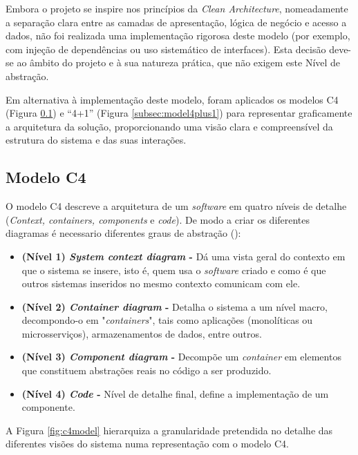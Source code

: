 Embora o projeto se inspire nos princípios da \textit{Clean Architecture}, nomeadamente a separação clara entre as camadas de apresentação, lógica de negócio e acesso a dados, não foi realizada uma implementação rigorosa deste modelo (por exemplo, com injeção de dependências ou uso sistemático de interfaces). Esta decisão deve-se ao âmbito do projeto e à sua natureza prática, que não exigem este Nível de abstração.

Em alternativa à implementação deste modelo, foram aplicados os modelos C4 (Figura \ref{subsec:modelC4}) e “4+1” (Figura \ref{subsec:model4plus1}) para representar graficamente a arquitetura da solução, proporcionando uma visão clara e compreensível da estrutura do sistema e das suas interações.


\subsection{Modelo C4}
\label{subsec:modelC4}

O modelo C4 descreve a arquitetura de um \textit{software} em quatro níveis de detalhe (\textit{Context, containers, components} e \textit{code}). De modo a criar os diferentes diagramas é necessario diferentes graus de abstração (\cite{Brown2018}):

\begin{itemize}
    \item \textbf{(Nível 1) \textit{System context diagram} -} Dá uma vista geral do contexto em que o sistema se insere, isto é, quem usa o \textit{software} criado e como é que outros sistemas inseridos no mesmo contexto comunicam com ele. 
    \item \textbf{(Nível 2) \textit{Container diagram} -} Detalha o sistema a um nível macro, decompondo-o em "\textit{containers}", tais como aplicações (monolíticas ou microsserviços), armazenamentos de dados, entre outros.
    \item \textbf{(Nível 3) \textit{Component diagram} -} Decompõe um \textit{container} em elementos que constituem abstrações reais no código a ser produzido.
    \item \textbf{(Nível 4) \textit{Code} -} Nível de detalhe final, define a implementação de um componente.
\end{itemize}

A Figura \ref{fig:c4model} hierarquiza a granularidade pretendida no detalhe das diferentes visões do sistema numa representação com o modelo C4.


